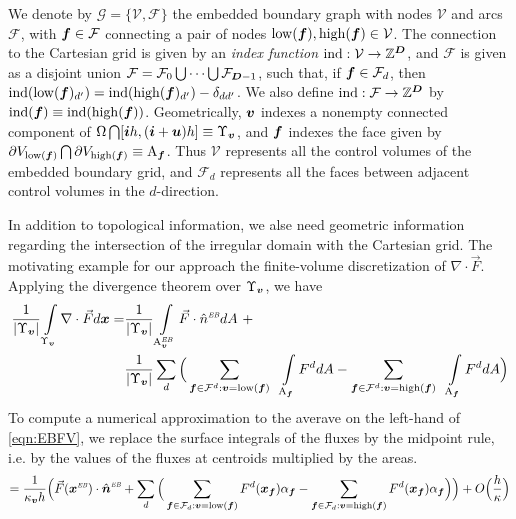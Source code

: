 \documentclass[12pt]{article}
\newcommand{\mcl}[1]{{\mathcal{#1}}}
\newcommand{\ind}{{\rm{ind}}}
\newcommand{\low}{{\rm{low}}}
\newcommand{\high}{{\rm{high}}}
\newcommand{\vol}[1]{{\Upsilon_{#1}}}
\newcommand{\area}[1]{{\rm{A}_{#1}}}
\newcommand{\vof}{{\mbf{v}}}
\newcommand{\face}{{\mbf{f}}}
\newcommand{\lr}[1]{{\langle #1 \rangle}}
\newcommand{\ebsub}{{\text{\it \tiny EB}}}
\newcommand{\areaEB}[1]{{{\rm A}_{#1}^{\ebsub}}}
\begin{document}
We denote by $\mcl{G} = \{ \mcl{V},\mcl{F} \}$ the embedded boundary graph with nodes $\mcl{V}$ and arcs $\mcl{F}$, with $\mbf{f} \in \mcl{F}$ connecting a pair of nodes
$ \low (\mbf{f}) , \high(\mbf{f})  \in \mcl{V}$. The connection to the Cartesian grid is given by an {\it index function} $\ind : \mcl{V} \rightarrow \mbb{Z}^\DIM$, and $\mcl{F}$ is given as a disjoint union $\mcl{F} = \mcl{F}_0 \bigcup \dots \bigcup \mcl{F}_{\DIM-1}$, such that, if $\mbf{f} \in \mcl{F}_d$, then $\ind (\low (\mbf{f} )_{d'} ) = \ind (\high (\mbf{f} )_{d'} ) - \delta_{d d'}$. We also define $\ind : \mcl{F} \rightarrow \mbb{Z}^\DIM$ by $\ind (\face) \equiv \ind(\high(\face))$. Geometrically, ${\boldsymbol{v}}$ indexes a nonempty connected component of $\Omega \bigcap [ \mbf{i} h,(\mbf{i} + \mbf{u}) h] \equiv \vol{\vof}$, and ${\boldsymbol{f}}$ indexes the face given by $\partial V_{\low(\mbf{f})} \bigcap \partial V_{\high(\mbf{f})} \equiv \area{\face}$. Thus $\mcl{V}$ represents all the control volumes of the embedded boundary grid, and $\mcl{F}_d$ represents all the faces between adjacent control volumes in the $d$-direction.

In addition to topological information, we alse need geometric information regarding the intersection of the irregular domain with the Cartesian grid. The motivating example for our approach the finite-volume discretization of $\nabla \cdot \vec{F}$. Applying the divergence theorem over $\vol{\vof}$, we have
\begin{align}
\frac{1}{|\vol{\vof}|} \int \limits_{\vol{\vof} } \nabla \cdot \vec{F} d \mbf{x} =  & \frac{1}{|\vol{\vof}|} \int \limits_{\areaEB{\vof}} \vec{F} \cdot \hat{n}^\ebsub d A ~ +  \nonumber
\\ & \frac{1}{|\vol{\vof}|} \sum \limits_d \Big ( \sum \limits_{\face \in \mcl{F}^d:\vof = \low(\face)} ~~ \int \limits_{\area{\face}} F^d dA -  \sum \limits_{\face \in \mcl{F}^d :\vof = \high(\face)}  ~~ \int \limits_{\area{\face}} F^d dA \Big )\label{eqn:EBFV} 
\end{align}
To compute a numerical approximation to the averave on the left-hand of \eqref{eqn:EBFV}, we replace the surface integrals of the fluxes by the midpoint rule, i.e. by the values of the fluxes at centroids multiplied by the areas. 
\begin{gather*}
= \frac{1}{\kappa_\vof h}\Big( \vec{F}(\mbf{x}^\ebsub ) \cdot \hat{\mbf{n}}^\ebsub +
\sum \limits_d \Big ( \sum \limits_{\face \in \mcl{F}_d:\vof = \low(\face)} F^d (\mbf{x}_\face ) \alpha_\face -  \sum \limits_{\face \in \mcl{F}_d :\vof = \high(\face)}   F^d (\mbf{x}_\face ) \alpha_\face \Big ) \Big ) + O \Big(\frac{h}{\kappa} \Big)
\end{gather*}
\end{document}
